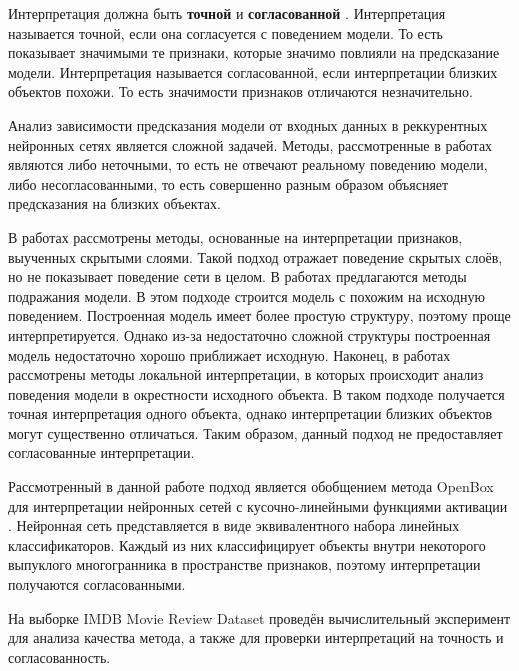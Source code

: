 \documentclass[a4paper, 12pt]{article}
\begin{document}
Интерпретация должна быть \textbf{точной} и \textbf{согласованной} \cite{chu2019exact}. Интерпретация называется точной, если она согласуется с поведением модели. То есть показывает значимыми те признаки, которые значимо повлияли на предсказание модели. Интерпретация называется согласованной, если интерпретации близких объектов похожи. То есть значимости признаков отличаются незначительно.

Анализ зависимости предсказания модели от входных данных в реккурентных нейронных сетях является сложной задачей. Методы, рассмотренные в работах \cite{dosovitskiy2016inverting, zhou2018interpreting, NIPS2014_ea8fcd92, bastani2019interpreting, zhou2015learning, simonyan2014deep} являются либо неточными, то есть не отвечают реальному поведению модели, либо несогласованными, то есть совершенно разным образом объясняет предсказания на близких объектах.

В работах \cite{dosovitskiy2016inverting, zhou2018interpreting} рассмотрены методы, основанные на интерпретации признаков, выученных скрытыми слоями. Такой подход отражает поведение скрытых слоёв, но не показывает поведение сети в целом. В работах \cite{NIPS2014_ea8fcd92, bastani2019interpreting} предлагаются методы подражания модели. В этом подходе строится модель с похожим на исходную поведением. Построенная модель имеет более простую структуру, поэтому проще интерпретируется. Однако из-за недостаточно сложной структуры построенная модель недостаточно хорошо приближает исходную. Наконец, в работах \cite{zhou2015learning, simonyan2014deep} рассмотрены методы локальной интерпретации, в которых происходит анализ поведения модели в окрестности исходного объекта. В таком подходе получается точная интерпретация одного объекта, однако интерпретации близких объектов могут существенно отличаться. Таким образом, данный подход не предоставляет согласованные интерпретации.

Рассмотренный в данной работе подход является обобщением метода OpenBox для интерпретации нейронных сетей с кусочно-линейными  функциями активации \cite{chu2019exact}. Нейронная сеть представляется в виде эквивалентного набора линейных классификаторов. Каждый из них классифицирует объекты внутри некоторого выпуклого многогранника в пространстве признаков, поэтому интерпретации получаются согласованными.

На выборке IMDB Movie Review Dataset \cite{maas-EtAl:2011:ACL-HLT2011} проведён вычислительный эксперимент для анализа качества метода, а также для проверки интерпретаций на точность и согласованность. 
\end{document}
